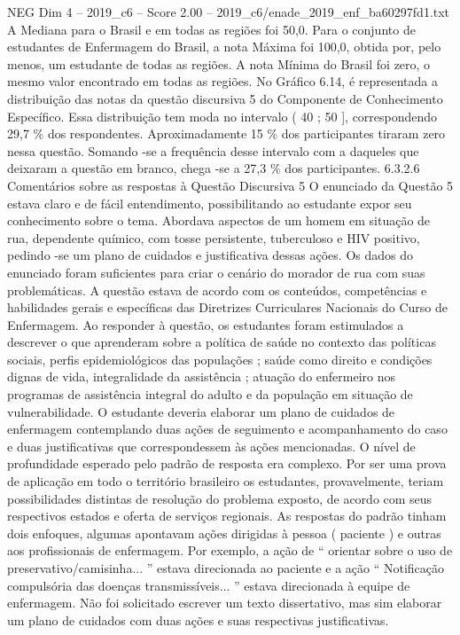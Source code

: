 \begin{textsample}{NEG Dim 4 – 2019\_c6 – Score 2.00 – 2019\_c6/enade\_2019\_enf\_ba60297fd1.txt}
A Mediana para o Brasil e em todas as regiões foi 50,0.
Para o conjunto de estudantes de Enfermagem do Brasil, a nota Máxima foi 100,0, obtida por, pelo menos, um estudante de todas as regiões.
A nota Mínima do Brasil foi zero, o mesmo valor encontrado em todas as regiões.
No Gráfico 6.14, é representada a distribuição das notas da questão discursiva 5 do Componente de Conhecimento Específico.
Essa distribuição tem moda no intervalo ( 40 ; 50 ], correspondendo 29,7 \% dos respondentes.
Aproximadamente 15 \% dos participantes tiraram zero nessa questão.
Somando -se a frequência desse intervalo com a daqueles que deixaram a questão em branco, chega -se a 27,3 \% dos participantes. 6.3.2.6 Comentários sobre as respostas à Questão Discursiva 5 O enunciado da Questão 5 estava claro e de fácil entendimento, possibilitando ao estudante expor seu conhecimento sobre o tema.
Abordava aspectos de um homem em situação de rua, dependente químico, com tosse persistente, tuberculoso e HIV positivo, pedindo -se um plano de cuidados e justificativa dessas ações.
Os dados do enunciado foram suficientes para criar o cenário do morador de rua com suas problemáticas.
A questão estava de acordo com os conteúdos, competências e habilidades gerais e específicas das Diretrizes Curriculares Nacionais do Curso de Enfermagem.
Ao responder à questão, os estudantes foram estimulados a descrever o que aprenderam sobre a política de saúde no contexto das políticas sociais, perfis epidemiológicos das populações ; saúde como direito e condições dignas de vida, integralidade da assistência ; atuação do enfermeiro nos programas de assistência integral do adulto e da população em situação de vulnerabilidade.
O estudante deveria elaborar um plano de cuidados de enfermagem contemplando duas ações de seguimento e acompanhamento do caso e duas justificativas que correspondessem às ações mencionadas.
O nível de profundidade esperado pelo padrão de resposta era complexo.
Por ser uma prova de aplicação em todo o território brasileiro os estudantes, provavelmente, teriam possibilidades distintas de resolução do problema exposto, de acordo com seus respectivos estados e oferta de serviços regionais.
As respostas do padrão tinham dois enfoques, algumas apontavam ações dirigidas à pessoa ( paciente ) e outras aos profissionais de enfermagem.
Por exemplo, a ação de “ orientar sobre o uso de preservativo/camisinha... ” estava direcionada ao paciente e a ação “ Notificação compulsória das doenças transmissíveis... ” estava direcionada à equipe de enfermagem.
Não foi solicitado escrever um texto dissertativo, mas sim elaborar um plano de cuidados com duas ações e suas respectivas justificativas.

\end{textsample}
